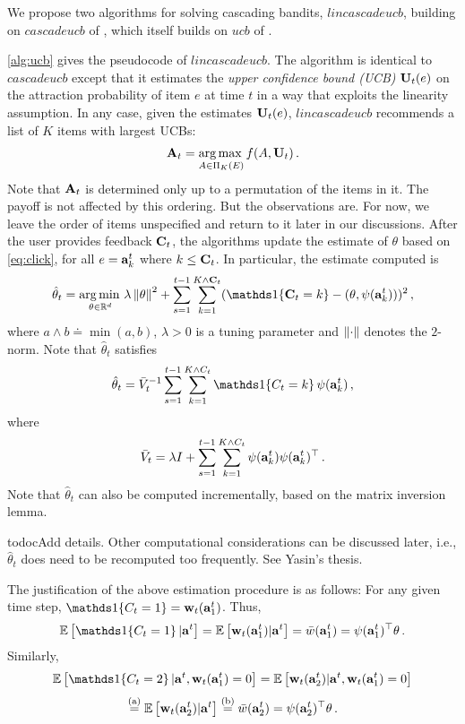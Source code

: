 We propose two algorithms for solving cascading bandits, $lincascadeucb$, building on $cascadeucb$ of
  \citet{kveton15cascade}, which itself builds on $ucb$ of \cite{auer02finitetime}.

\cref{alg:ucb} gives the pseudocode of $lincascadeucb$.
The algorithm is identical to $cascadeucb$ except that it estimates the
\emph{upper confidence bound (UCB)} $\mathbf{U}_t(e)$ on the attraction probability of item $e$ at time $t$
in a way that exploits the linearity assumption.
In any case, given the estimates $\mathbf{U}_t(e)$,
$lincascadeucb$ recommends a list of $K$ items with largest UCBs:
\begin{align}
  \mathbf{A}_t = \operatorname*{arg\,max\,}_{A \in \Pi_K(E)} f(A, \mathbf{U}_t)\,.
\end{align}
Note that $\mathbf{A}_t$ is determined only up to a permutation of the items in it. The payoff is not affected by this ordering. But the observations are. For now, we leave the order of items unspecified and return to it later in our discussions. After the user provides feedback $\mathbf{C}_t$, the algorithms update the estimate of $\theta$
based on \eqref{eq:click}, for all $e = \mathbf{a}^t_k$ where $k \leq \mathbf{C}_t$.
In particular, the estimate computed is
\begin{align}
\label{eq:ridge}
\hat{\rnd{\theta}}_t = \argmin_{\theta\in \mathbb{R}^d}
\lambda \norm{\theta}^2 +
 \sum_{s=1}^{t-1} \sum_{k=1}^{K\wedge \rnd{C}_t} ( \I{\rnd{C}_t = k} - (\theta,\psi(\rnd{a}^t_k)))^2 \,,
\end{align}
where $a\wedge b \doteq \min(a,b)$, $\lambda>0$ is a tuning parameter and $\left\|\cdot\right\|$ denotes the $2$-norm.
Note that $\hat{\theta}_t$ satisfies
\begin{align*}
  \hat{\rnd{\theta}}_t = \bar{V}_t^{-1} \sum_{s=1}^{t-1} \sum_{k=1}^{K \wedge C_t}
  \I{C_t=k} \psi(\rnd{a}^t_k)\,,
\end{align*}
where
\[
\bar{V}_t = \lambda I + \sum_{s=1}^{t-1} \sum_{k=1}^{K \wedge C_t}
\psi(\mathbf{a}^t_k) \psi(\mathbf{a}^t_k)^\top\,.
\]
Note that $\hat{\theta}_t$ can also be computed incrementally, based on the matrix inversion lemma.

todoc{Add details. Other computational considerations can be discussed later, i.e., $\hat{\theta}_t$ does need to be recomputed too frequently. See Yasin's thesis.}

The justification of the above estimation procedure is as follows:
For any given time step, $\I{C_t=1} = \rnd{w}_t(\rnd{a}^t_1)$.
Thus,
\begin{align*}
\EE{ \I{C_t=1} | \rnd{a}^t }
 =  \EE{ \rnd{w}_t(\rnd{a}^t_1) | \rnd{a}^t }
 = \bar{w}(\rnd{a}^t_1) = \psi(\rnd{a}^t_1)^\top \theta\,.
\end{align*}
Similarly,
\begin{align*}
\EE{ \I{C_t=2} | \rnd{a}^t, \rnd{w}_t(\rnd{a}^t_1 ) = 0 }
=  \EE{ \rnd{w}_t(\rnd{a}^t_2) | \rnd{a}^t, \rnd{w}_t(\rnd{a}^t_1 ) = 0  }
\end{align*}
\begin{align*}
\stackrel{\mathrm{\footnotesize (a)}}{=}
	  \mathbb{E} \left[ \mathbf{w}_t(\mathbf{a}^t_2) | \mathbf{a}^t \right]
\stackrel{\mathrm{\footnotesize (b)}}{=}
	\bar{w}(\mathbf{a}^t_2) = \psi(\mathbf{a}^t_2)^\top \theta\,.
\end{align*}


